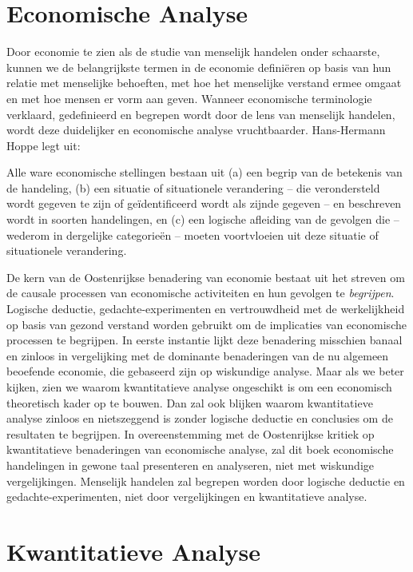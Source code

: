 \section{Economische Analyse}

Door economie te zien als de studie van menselijk handelen onder schaarste, kunnen we de belangrijkste termen in de economie definiëren op basis van hun relatie met menselijke behoeften, met hoe het menselijke verstand ermee omgaat en met hoe mensen er vorm aan geven. Wanneer economische terminologie verklaard, gedefinieerd en begrepen wordt door de lens van menselijk handelen, wordt deze duidelijker en economische analyse vruchtbaarder. Hans-Hermann Hoppe legt uit:

\begin{blockquotebox}
Alle ware economische stellingen bestaan uit (a) een begrip van de betekenis van de handeling, (b) een situatie of situationele verandering – die verondersteld wordt gegeven te zijn of geïdentificeerd wordt als zijnde gegeven – en beschreven wordt in soorten handelingen, en (c) een logische afleiding van de gevolgen die – wederom in dergelijke categorieën – moeten voortvloeien uit deze situatie of situationele verandering.\footnotemark 
\end{blockquotebox}

De kern van de Oostenrijkse benadering van economie bestaat uit het streven om de causale processen van economische activiteiten en hun gevolgen te \textit{begrijpen}. Logische deductie, gedachte-experimenten en vertrouwdheid met de werkelijkheid op basis van gezond verstand worden gebruikt om de implicaties van economische processen te begrijpen. In eerste instantie lijkt deze benadering misschien banaal en zinloos in vergelijking met de dominante benaderingen van de nu algemeen beoefende economie, die gebaseerd zijn op wiskundige analyse. Maar als we beter kijken, zien we waarom kwantitatieve analyse ongeschikt is om een economisch theoretisch kader op te bouwen. Dan zal ook blijken waarom kwantitatieve analyse zinloos en nietszeggend is zonder logische deductie en conclusies om de resultaten te begrijpen. In overeenstemming met de Oostenrijkse kritiek op kwantitatieve benaderingen van economische analyse, zal dit boek economische handelingen in gewone taal presenteren en analyseren, niet met wiskundige vergelijkingen. Menselijk handelen zal begrepen worden door logische deductie en gedachte-experimenten, niet door vergelijkingen en kwantitatieve analyse.

\section{Kwantitatieve Analyse}


